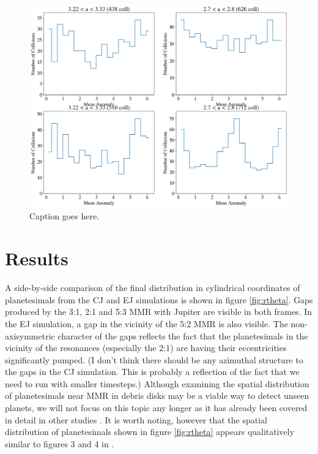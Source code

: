 \documentclass[twocolumn]{aastex63}
\begin{document}
\begin{figure}
    \includegraphics[width=\textwidth]{figures/m_hist.png}
    \caption{Caption goes here.\label{fig:m_hist}}
\end{figure}

\section{Results} \label{sec:results}

A side-by-side comparison of the final distribution in cylindrical coordinates of planetesimals from the CJ and EJ simulations is shown in figure \ref{fig:rtheta}. Gaps produced by the 3:1, 2:1 and 5:3 MMR with Jupiter are visible in both frames. In the EJ simulation, a gap in the vicinity of the 5:2 MMR is also visible. The non-axisymmetric character of the gaps reflects the fact that the planetesimals in the vicinity of the resonances (especially the 2:1) are having their eccentricities significantly pumped. (I don't think there should be any azimuthal structure to the gaps in the CJ simulation. This is probably a reflection of the fact that we need to run with smaller timesteps.) Although examining the spatial distribution of planetesimals near MMR in debris disks may be a viable way to detect unseen planets, we will not focus on this topic any longer as it has already been covered in detail in other studies \citep{2016ApJ...818..159T, 2018ApJ...857....3T}. It is worth noting, however that the spatial distribution of planetesimals shown in figure \ref{fig:rtheta} appears qualitatively similar to figures 3 and 4 in \citep{2016ApJ...818..159T}.
\end{document}
